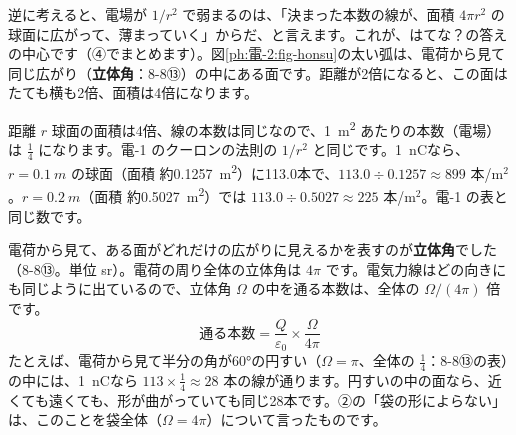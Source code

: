 \begin{bkfigure}
\label{ph:電-2:fig-honsu}
\end{bkfigure}

\noindent 逆に考えると、電場が $1/r^2$ で弱まるのは、「決まった本数の線が、面積 $4\pi r^2$ の球面に広がって、薄まっていく」からだ、と言えます。これが、はてな？の答えの中心です（④でまとめます）。図\ref{ph:電-2:fig-honsu}の太い弧は、電荷から見て同じ広がり（\textbf{立体角}：8-8⑬）の中にある面です。距離が2倍になると、この面はたても横も2倍、面積は4倍になります。

\begin{phbaisuru}{距離 $r$}
球面の面積は4倍、線の本数は同じなので、\qty{1}{m^2} あたりの本数（電場）は $\tfrac14$ になります。電-1 のクーロンの法則の $1/r^2$ と同じです。\qty{1}{nC}なら、$r=\qty{0.1}{m}$ の球面（面積 約\qty{0.1257}{m^2}）に113.0本で、$113.0\div0.1257\approx899$ 本/m$^2$。$r=\qty{0.2}{m}$（面積 約\qty{0.5027}{m^2}）では $113.0\div0.5027\approx225$ 本/m$^2$。電-1 の表と同じ数です。
\end{phbaisuru}

\begin{motto}[4]
電荷から見て、ある面がどれだけの広がりに見えるかを表すのが\textbf{立体角}でした（8-8⑬。単位 sr）。電荷の周り全体の立体角は $4\pi$ です。電気力線はどの向きにも同じように出ているので、立体角 $\Omega$ の中を通る本数は、全体の $\Omega/(4\pi)$ 倍です。
\[\text{通る本数}=\frac{Q}{\varepsilon_0}\times\frac{\Omega}{4\pi}\]
たとえば、電荷から見て半分の角が60°の円すい（$\Omega=\pi$、全体の $\tfrac14$：8-8⑬の表）の中には、\qty{1}{nC}なら $113\times\tfrac14\approx28$ 本の線が通ります。円すいの中の面なら、近くても遠くても、形が曲がっていても同じ28本です。②の「袋の形によらない」は、このことを袋全体（$\Omega=4\pi$）について言ったものです。
\end{motto}

